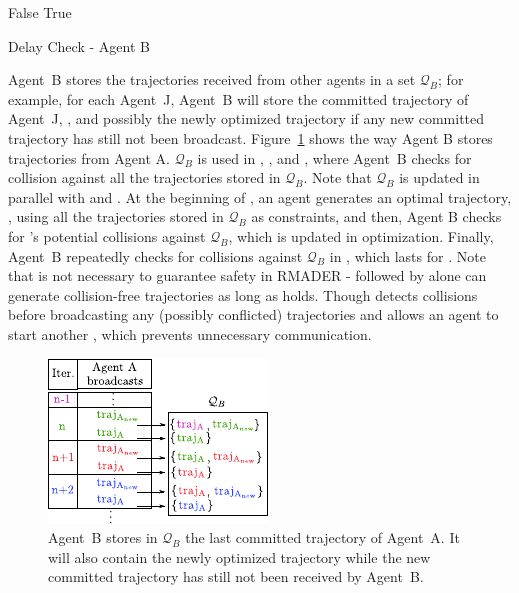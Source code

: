 \begin{algorithm}
    \newcommand{\algorithmicbreak}{\textbf{break}}
    \begin{algorithmic}[1] %
    \Function {\textproc{\DelayCheckStep{}}}{\trajBNew{}}
                \State \Return False
             \EndIf
         \EndFor
    \State \Return True
    \EndFunction
    \end{algorithmic}
    \caption{Delay Check - Agent B}\label{alg:pess_delaycheck}
\end{algorithm}

\newcommand{\QB}{\ensuremath{\mathcal{Q}_B}}

Agent~B stores the trajectories received from other agents in a set \QB{}; for example, for each Agent~J, Agent~B will store the committed trajectory of Agent~J, \trajJ{}, and possibly the newly optimized trajectory \trajJNew{} if any new committed trajectory has still not been broadcast. Figure~\ref{fig:QB_definition} shows the way Agent B stores trajectories from Agent A. 
\QB{} is used in \OStep{}, \CheckStep{}, and \DCStep{},  where Agent~B checks for collision against all the trajectories stored in \QB{}. Note that \QB{} is updated in parallel with \OStep{} and \DCStep{}. 
At the beginning of \OStepB{}, an agent generates an optimal trajectory, \trajBNew{}, using all the trajectories stored in \QB{} as constraints, and then, Agent B checks for \trajBNew{}'s potential collisions against \QB{}, which is updated in optimization. 
Finally, Agent~B repeatedly checks for collisions against \QB{} in \DCStepB{}, which lasts for \delayParameter{}. 
Note that \CStep{} is not necessary to guarantee safety in RMADER - \OStep{} followed by \DCStep{} alone can generate collision-free trajectories as long as \NeccessaryCond{} holds. Though \CStep{} detects collisions before broadcasting any (possibly conflicted) trajectories and allows an agent to start another \OStep{}, which prevents unnecessary communication.

\begin{figure}
    \centering
    \includegraphics[width=0.6\columnwidth]{figures/QB_definition.pdf}
    \setlength{\belowcaptionskip}{-0.5em}
    \caption{Agent~B stores in \QB{} the last committed trajectory of Agent~A. It will also contain the newly optimized trajectory \trajANew{} while the new committed trajectory has still not been received by Agent~B. }
    \label{fig:QB_definition}
\end{figure}

